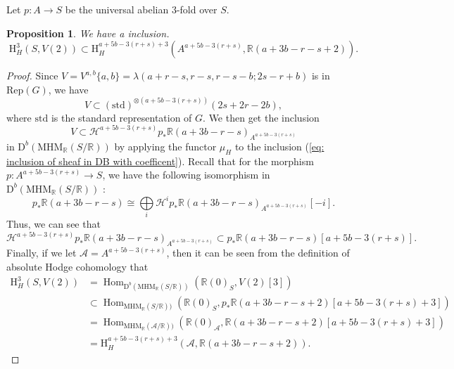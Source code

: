 \documentclass[11pt, a4paper]{amsart}
\theoremstyle{plain}
\newtheorem{proposition}[theorem]{Proposition}
\theoremstyle{definition}
\numberwithin{equation}{section}
\def\RR{\mathbb{R}}
\DeclareMathOperator{\Hom}{Hom}
\begin{document}
Let $p \colon A \rightarrow S$ be the universal abelian $3$-fold over $S$. 

\begin{proposition}
\label{Prop:motiv_coh_abs_relative}
    We have a inclusion. 
    \begin{equation}
        \mathrm{H}^{3}_{H}(S, V(2)) \subset \mathrm{H}_{H}^{a + 5b - 3(r+s) + 3}(A^{a + 5b - 3(r+s)}, \RR(a + 3b -r - s + 2)). 
    \end{equation}
\end{proposition}

\begin{proof}
    Since $V = V^{a, b}\{a, b \} = \lambda(a + r - s, r - s,  r - s - b; 2s - r + b)$ is in $\mathrm{Rep}(G)$, we have   
    \begin{equation*}
        V \subset (\mathrm{std})^{\otimes(a + 5b - 3(r+s))}(2s + 2r -2b),
    \end{equation*}
    where $\mathrm{std}$ is the standard representation of $G$. We then get the inclusion
    \begin{equation}
    \label{eq: inclusion of sheaf in DB with coefficent}
        V \subset \mathcal{H}^{a + 5b - 3(r + s)}p_{*}\RR(a + 3b -r - s)_{A^{a + 5b - 3(r + s)}}
    \end{equation}
    in $\mathrm{D}^{b}(\mathrm{MHM}_{\RR}(S/\RR))$ by applying the functor $\mu_{H}$ to the inclusion (\ref{eq: inclusion of sheaf in DB with coefficent}). 
    Recall that for the morphism $p \colon A^{a + 5b - 3(r+s)} \rightarrow S$, we have the following isomorphism in $\mathrm{D}^{b}(\mathrm{MHM}_{\RR}(S/\RR))$ \cite[(4.5.4)]{MHM90}: 
    \begin{equation*}
        p_{*}\RR(a + 3b -r - s) \cong \bigoplus\limits_{i} \mathcal{H}^{i}p_{*} \RR(a + 3b -r - s)_{A^{a + 5b - 3(r + s)}}[-i]. 
    \end{equation*}
    Thus, we can see that
    \begin{equation*}
        \mathcal{H}^{a + 5b - 3(r + s)} p_{*}\RR(a + 3b - r - s)_{A^{a + 5b - 3(r + s)}} \subset p_{*}\RR(a + 3b - r - s)[a + 5b - 3(r+s)]. 
    \end{equation*}
    Finally, if we let $\mathcal{A} = A^{a + 5b - 3(r+s)}$, then it can be seen from the definition of absolute Hodge cohomology that  
    \begin{align*}
        \mathrm{H}^{3}_{H}(S, V(2)) &= \Hom_{\mathrm{D}^{b}(\mathrm{MHM}_{\RR}(S/\RR))}(\RR(0)_{S}, V(2)[3]) \\
                                    & \subset \Hom_{\mathrm{MHM}_{\RR}(S/\RR))}(\RR(0)_{S}, p_{*}\RR(a + 3b -r - s + 2)[a + 5b - 3(r+s) + 3]) \\ 
                                    & = \Hom_{\mathrm{MHM}_{\RR}(\mathcal{A}/\RR))}(\RR(0)_{\mathcal{A}}, \RR(a + 3b -r - s + 2)[a + 5b - 3(r+s) + 3]) \\
                                    & = \mathrm{H}_{H}^{a + 5b - 3(r+s) + 3}(\mathcal{A}, \RR(a + 3b - r -s + 2)). 
    \end{align*}
\end{proof}
\end{document}
